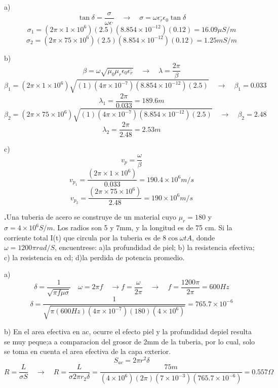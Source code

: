 \documentclass{article}
\newcounter{ejercicio}
\renewcommand{\theejercicio}{\arabic{ejercicio}}
\begin{document}
\vspace{0.5cm}

\noindent a) \[ \tan \delta =\frac{\sigma}{\omega \epsilon^,} \quad \rightarrow \quad \sigma =\omega \epsilon_r^, \epsilon_0 \tan \delta \]
\[\sigma_1 =(2\pi \times 1\times10^6)(2.5)(8.854\times 10^{-12}) (0.12)=16.09\mu S/m\]
\[\sigma_2 =(2\pi \times 75\times10^6)(2.5)(8.854\times 10^{-12}) (0.12)=1.25m S/m\]

\vspace{0.5cm}

\noindent b) 
\[ \beta=\omega\sqrt{\mu_0\mu_r\epsilon_0\epsilon_r^,} \quad \rightarrow \quad \lambda=\frac{2\pi}{\beta}\]
\[\beta_1=(2\pi \times 1\times10^6)\sqrt{(1)(4\pi\times10^{-7})(8.854\times10^{-12})(2.5)} \quad \rightarrow \quad \beta_1=0.033\]
\[\lambda_1=\frac{2\pi}{0.033}=189.6m\]
\[\beta_2=(2\pi \times 75\times10^6)\sqrt{(1)(4\pi\times10^{-7})(8.854\times10^{-12})(2.5)} \quad \rightarrow \quad \beta_2=2.48\]
\[\lambda_2=\frac{2\pi}{2.48}=2.53m\]

\vspace{0.5cm}

\noindent c) \[v_p=\frac{\omega}{\beta} \]
\[v_{p_1}=\frac{(2\pi\times1\times10^6)}{0.033}=190.4\times10^6m/s\]
\[v_{p_2}=\frac{(2\pi\times75\times10^6)}{2.48}=190\times10^6m/s\]

\vspace{0.5cm}

\noindent \textbf{\theejercicio.}Una tuberia de acero se construye de un material cuyo $\mu_r=180$ y $\sigma=4\times 10^6S/m$. Los radios son 5 y 7mm, y la longitud es de 75 cm. Si la corriente total I(t) que circula por la tuberia es de $8\cos\omega t A$, donde $\omega=1200\pi rad/S$, encuentrese: a)la profundidad de piel; b) la resistencia efectiva; c) la resistencia en cd; d)la perdida de potencia promedio.

\vspace{0.5cm}

\noindent a)
\[ \delta=\frac{1}{\sqrt{\pi f\mu\sigma}}\quad \omega=2\pi f \quad \rightarrow  f=\frac{\omega}{2\pi}\quad \rightarrow \quad f=\frac{1200\pi}{2\pi}=600Hz\]
\[\delta=\frac{1}{\sqrt{\pi (600Hz)(4\pi\times10^{-7})(180)(4\times10^6)}}=765.7\times10^{-6}\]

\vspace{0.5cm}

\noindent b) En el area efectiva en ac, ocurre el efecto piel y la profundidad depiel resulta se muy peque;a a comparacion del grosor de 2mm de la tuberia, por lo cual, solo se toma en cuenta el area efectiva de la capa exterior.
\[S_{ac}=2\pi r^2\delta\]
\[R=\frac{L}{\sigma S} \quad \rightarrow \quad R=\frac{L}{\sigma 2\pi r_2\delta}=\frac{75m}{(4\times 10^6 )(2\pi) (7\times 10^{-3})(765.7\times 10^{-6})}=0.557\Omega\]
\end{document}
